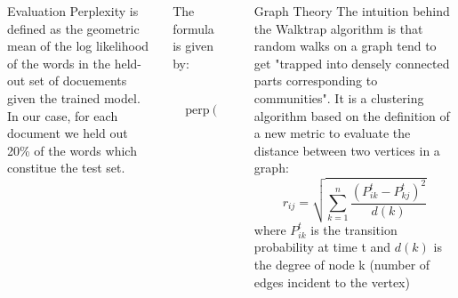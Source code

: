 \documentclass[final]{beamer}
\newlength{\sepwid}
\newlength{\onecolwid}
\newlength{\twocolwid}
\begin{document}
\begin{frame}[t]
\begin{columns}[t]
\begin{column}{\twocolwid}
\begin{columns}[t,totalwidth=\twocolwid]
\begin{column}{\onecolwid}
\begin{block}{Evaluation}
\small
Perplexity is defined as the geometric mean of the log likelihood of the words in the held-out set of docuements given the trained model. In our case, for each document we held out 20\% of the words which constitue the test set.
\end{block}


\end{column} %

\begin{column}{\onecolwid}\hspace{-0.6in} %

\small
\vfill{The formula is given by:}
\begin{center}
$$
	\boxed{\quad\text{perp}(D_{test}) = \frac{\sum_{d \in D_{test}} \sum_{w \in d} \log \left( \sum_{t \in topics} p(w|t) p(t|d) \right)}{\sum_{d \in D_{test}|d|}}\quad}
$$

\end{center}

\end{column} %

\end{columns} %



\end{column} %

\begin{column}{\sepwid}\end{column} %

\begin{column}{\onecolwid}\vspace{-0.6in} %

\begin{block}{Graph Theory}
\small
 The intuition behind the Walktrap algorithm is that random walks on a graph tend to get "trapped into densely connected parts corresponding to communities".\cite{Gr} It is a clustering algorithm based on the definition of a new metric to evaluate the distance between two vertices in a graph:
 $$r_{ij} = \sqrt{\sum\limits_{k=1}^{n}\frac{(P^t_{ik}-P^t_{kj})^2}{d(k)}}$$
 where $P^t_{ik}$ is the transition probability at time t and $d(k)$ is the degree of node k (number of edges incident to the vertex)
\end{block}


\end{column}
\end{columns}
\end{frame}
\end{document}

